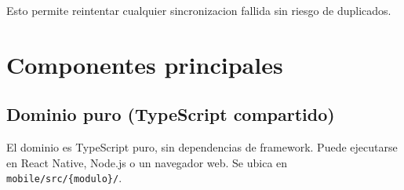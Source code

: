 \documentclass[11pt,a4paper,oneside]{report}
\begin{document}
Esto permite reintentar cualquier sincronizacion fallida sin riesgo de duplicados.


\chapter{Componentes principales}

\section{Dominio puro (TypeScript compartido)}

El dominio es TypeScript puro, sin dependencias de framework. Puede ejecutarse en React Native, Node.js o un navegador web. Se ubica en \texttt{mobile/src/\{modulo\}/}.
\end{document}
